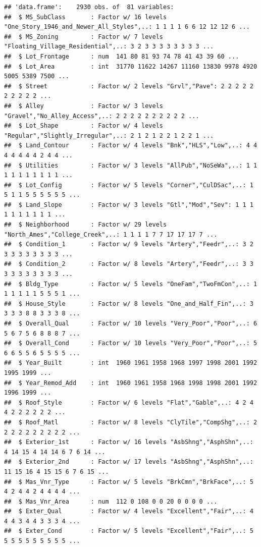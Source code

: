 \documentclass[
]{book}
\begin{document}
\begin{verbatim}
## 'data.frame':    2930 obs. of  81 variables:
##  $ MS_SubClass       : Factor w/ 16 levels "One_Story_1946_and_Newer_All_Styles",..: 1 1 1 1 6 6 12 12 12 6 ...
##  $ MS_Zoning         : Factor w/ 7 levels "Floating_Village_Residential",..: 3 2 3 3 3 3 3 3 3 3 ...
##  $ Lot_Frontage      : num  141 80 81 93 74 78 41 43 39 60 ...
##  $ Lot_Area          : int  31770 11622 14267 11160 13830 9978 4920 5005 5389 7500 ...
##  $ Street            : Factor w/ 2 levels "Grvl","Pave": 2 2 2 2 2 2 2 2 2 2 ...
##  $ Alley             : Factor w/ 3 levels "Gravel","No_Alley_Access",..: 2 2 2 2 2 2 2 2 2 2 ...
##  $ Lot_Shape         : Factor w/ 4 levels "Regular","Slightly_Irregular",..: 2 1 2 1 2 2 1 2 2 1 ...
##  $ Land_Contour      : Factor w/ 4 levels "Bnk","HLS","Low",..: 4 4 4 4 4 4 4 2 4 4 ...
##  $ Utilities         : Factor w/ 3 levels "AllPub","NoSeWa",..: 1 1 1 1 1 1 1 1 1 1 ...
##  $ Lot_Config        : Factor w/ 5 levels "Corner","CulDSac",..: 1 5 1 1 5 5 5 5 5 5 ...
##  $ Land_Slope        : Factor w/ 3 levels "Gtl","Mod","Sev": 1 1 1 1 1 1 1 1 1 1 ...
##  $ Neighborhood      : Factor w/ 29 levels "North_Ames","College_Creek",..: 1 1 1 1 7 7 17 17 17 7 ...
##  $ Condition_1       : Factor w/ 9 levels "Artery","Feedr",..: 3 2 3 3 3 3 3 3 3 3 ...
##  $ Condition_2       : Factor w/ 8 levels "Artery","Feedr",..: 3 3 3 3 3 3 3 3 3 3 ...
##  $ Bldg_Type         : Factor w/ 5 levels "OneFam","TwoFmCon",..: 1 1 1 1 1 1 5 5 5 1 ...
##  $ House_Style       : Factor w/ 8 levels "One_and_Half_Fin",..: 3 3 3 3 8 8 3 3 3 8 ...
##  $ Overall_Qual      : Factor w/ 10 levels "Very_Poor","Poor",..: 6 5 6 7 5 6 8 8 8 7 ...
##  $ Overall_Cond      : Factor w/ 10 levels "Very_Poor","Poor",..: 5 6 6 5 5 6 5 5 5 5 ...
##  $ Year_Built        : int  1960 1961 1958 1968 1997 1998 2001 1992 1995 1999 ...
##  $ Year_Remod_Add    : int  1960 1961 1958 1968 1998 1998 2001 1992 1996 1999 ...
##  $ Roof_Style        : Factor w/ 6 levels "Flat","Gable",..: 4 2 4 4 2 2 2 2 2 2 ...
##  $ Roof_Matl         : Factor w/ 8 levels "ClyTile","CompShg",..: 2 2 2 2 2 2 2 2 2 2 ...
##  $ Exterior_1st      : Factor w/ 16 levels "AsbShng","AsphShn",..: 4 14 15 4 14 14 6 7 6 14 ...
##  $ Exterior_2nd      : Factor w/ 17 levels "AsbShng","AsphShn",..: 11 15 16 4 15 15 6 7 6 15 ...
##  $ Mas_Vnr_Type      : Factor w/ 5 levels "BrkCmn","BrkFace",..: 5 4 2 4 4 2 4 4 4 4 ...
##  $ Mas_Vnr_Area      : num  112 0 108 0 0 20 0 0 0 0 ...
##  $ Exter_Qual        : Factor w/ 4 levels "Excellent","Fair",..: 4 4 4 3 4 4 3 3 3 4 ...
##  $ Exter_Cond        : Factor w/ 5 levels "Excellent","Fair",..: 5 5 5 5 5 5 5 5 5 5 ...

\end{verbatim}
\end{document}
